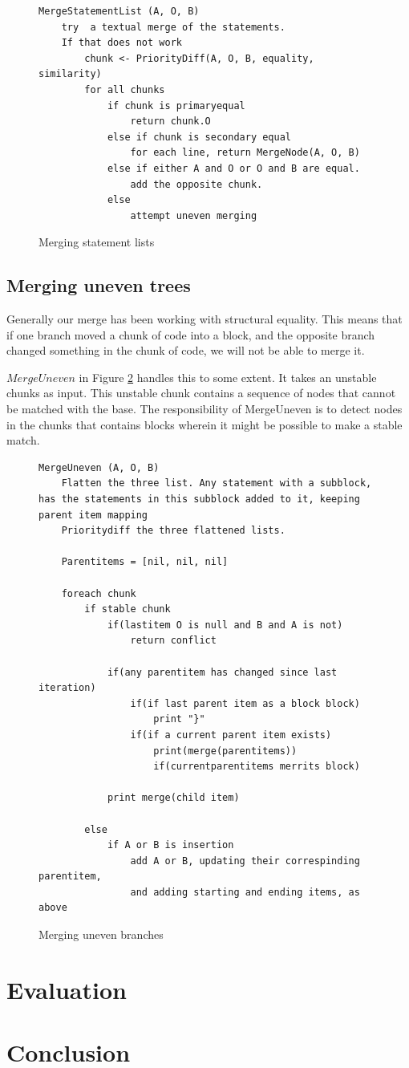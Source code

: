 \documentclass[11pt]{article}
\begin{document}
\begin{figure}
  \caption{Merging statement lists}
  \label{MergeStatementList}
\begin{verbatim}
MergeStatementList (A, O, B)
    try  a textual merge of the statements.
    If that does not work
        chunk <- PriorityDiff(A, O, B, equality, similarity)
        for all chunks
            if chunk is primaryequal
                return chunk.O
            else if chunk is secondary equal
                for each line, return MergeNode(A, O, B)
            else if either A and O or O and B are equal.
                add the opposite chunk.
            else 
                attempt uneven merging
\end{verbatim}
\end{figure}

\subsection{Merging uneven trees}
Generally our merge has been working with structural equality. This means that if one branch moved a chunk of code into a block, and the opposite branch changed something in the chunk of code, we will not be able to merge it.

$MergeUneven$ in Figure \ref{MergeUneven} handles this to some extent. It takes an unstable chunks as input. This unstable chunk contains a sequence of nodes that cannot be matched with the base. The responsibility of MergeUneven is to detect nodes in the chunks that contains blocks wherein it might be possible to make a stable match.


\begin{figure}
\begin{verbatim}
MergeUneven (A, O, B)
    Flatten the three list. Any statement with a subblock, has the statements in this subblock added to it, keeping parent item mapping
    Prioritydiff the three flattened lists.

    Parentitems = [nil, nil, nil]

    foreach chunk
        if stable chunk
            if(lastitem O is null and B and A is not)
                return conflict

            if(any parentitem has changed since last iteration)
                if(if last parent item as a block block)
                    print "}"
                if(if a current parent item exists)
                    print(merge(parentitems))
                    if(currentparentitems merrits block)
            
            print merge(child item)

        else 
            if A or B is insertion
                add A or B, updating their correspinding parentitem,
                and adding starting and ending items, as above
\end{verbatim}
\caption{Merging uneven branches}
\label{MergeUneven}
\end{figure}


\clearpage
\section{Evaluation}

\clearpage
\section{Conclusion}

\clearpage



\end{document}
